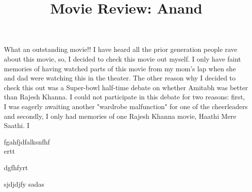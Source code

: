 \documentclass[12pt, a4paper]{article}
\title{Movie Review: Anand}
\author{}
\date{}
\begin{document}
\maketitle
What an outstanding movie!! I have heard all the prior generation people rave about this movie, so, I decided to check this movie out myself. I only have faint memories of having watched parts of this movie from my mom's lap when she and dad were watching this in the theater. The other reason why I decided to check this out was a Super-bowl half-time debate on whether Amitabh was better than Rajesh Khanna. I could not participate in this debate for two reasons: first, I was eagerly awaiting another "wardrobe malfunction" for one of the cheerleaders and secondly, I only had memories of one Rajesh Khanna movie, Haathi Mere Saathi. I

fgahfjdfalksnfhf\\

ertt

dgfhfyrt

sjdjdjfy
sadas
\end{document}
